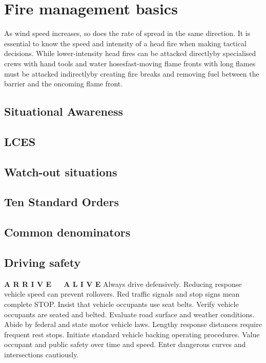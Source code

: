 \chapter{Fire management basics}

As wind speed increases, so does the rate of spread in the same direction. 
It is essential to know the speed and intensity of a head fire when making tactical decisions.
While lower-intensity head fires can be attacked directly\textemdash by specialised crews with hand tools and water hoses\textemdash fast-moving flame fronts with long flames must be attacked indirectly\textemdash by creating fire breaks and removing fuel between the barrier and the oncoming flame front.

\section{Situational Awareness}

\section{LCES}

\section{Watch-out situations}

\section{Ten Standard Orders} 

\section{Common denominators} 

\section{Driving safety} 
\textbf{A R R I V E~~~A L I V E} 
Always drive defensively.
Reducing response vehicle speed
can prevent rollovers.
Red traffic signals and stop signs
mean complete STOP.
Insist that vehicle occupants use
seat belts.
Verify vehicle occupants are
seated and belted.
Evaluate road surface and
weather conditions.
Abide by federal and state motor
vehicle laws.
Lengthy response distances
require frequent rest stops.
Initiate standard vehicle backing operating procedures.
Value occupant and public safety over time and speed.
Enter dangerous curves and intersections cautiously.